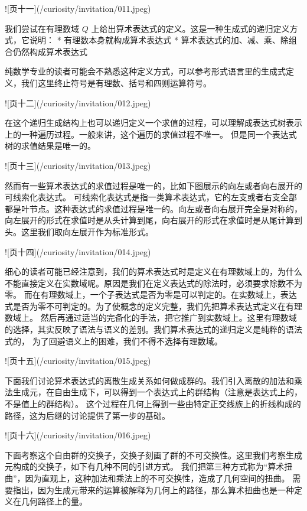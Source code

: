 \documentclass[a4paper,12pt]{book}
\numberwithin{problem}{section}
\numberwithin{definition}{section}
\numberwithin{lemma}{section}
\numberwithin{proposition}{section}
\numberwithin{theorem}{section}
\numberwithin{grammar}{section}
\numberwithin{program}{section}
\numberwithin{convention}{section}
\numberwithin{corollary}{section}
\begin{document}
![页十一](/curiosity/invitation/011.jpeg)

我们尝试在有理数域 $Q$ 上给出算术表达式的定义。这是一种生成式的递归定义方式，它说明：
* 有理数本身就构成算术表达式
* 算术表达式的加、减、乘、除组合仍然构成算术表达式

纯数学专业的读者可能会不熟悉这种定义方式，可以参考形式语言里的生成式定义，我们这里终止符号是有理数、括号和四则运算符号。

![页十二](/curiosity/invitation/012.jpeg)

在这个递归生成结构上也可以递归定义一个求值的过程，可以理解成表达式树表示上的一种遍历过程。一般来讲，这个遍历的求值过程不唯一。
但是同一个表达式树的求值结果是唯一的。

![页十三](/curiosity/invitation/013.jpeg)

然而有一些算术表达式的求值过程是唯一的，比如下图展示的向左或者向右展开的可线索化表达式。
可线索化表达式是指一类算术表达式，它的左支或者右支全部都是叶节点。这种表达式的求值过程是唯一的。向左或者向右展开完全是对称的，
向左展开的形式在求值时是从头计算到尾，向右展开的形式在求值时是从尾计算到头。这里我们取向左展开作为标准形式。

![页十四](/curiosity/invitation/014.jpeg)

细心的读者可能已经注意到，我们的算术表达式时是定义在有理数域上的，为什么不能直接定义在实数域呢。原因是我们在定义表达式的除法时，必须要求除数不为零。
而在有理数域上，一个子表达式是否为零是可以判定的。在实数域上，表达式是否为零不可判定的。为了使概念的定义完整，我们先把算术表达式定义在有理数域上。
然后再通过适当的完备化的手法，把它推广到实数域上。这里有理数域的选择，其实反映了语法与语义的差别。我们算术表达式的递归定义是纯粹的语法式的，
为了回避语义上的困难，我们不得不选择有理数域。

![页十五](/curiosity/invitation/015.jpeg)

下面我们讨论算术表达式的离散生成关系如何做成群的。我们引入离散的加法和乘法生成元，在自由生成下，可以得到一个表达式上的群结构（注意是表达式上的，不是值上的群结构）。
这个过程在几何上得到一些由特定正交线族上的折线构成的路径，这为后继的讨论提供了第一步的基础。

![页十六](/curiosity/invitation/016.jpeg)

下面考察这个自由群的交换子，交换子刻画了群的不可交换性。这里我们考察生成元构成的交换子，如下有几种不同的引进方式。
我们把第三种方式称为“算术扭曲”，因为直观上，这种加法和乘法上的不可交换性，造成了几何空间的扭曲。
需要指出，因为生成元带来的运算被解释为几何上的路径，那么算术扭曲也是一种定义在几何路径上的量。
\end{document}
